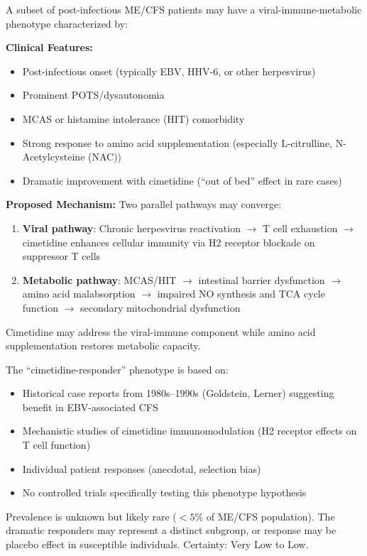 \begin{hypothesis}
\label{hyp:cimetidine-responder}
A subset of post-infectious ME/CFS patients may have a viral-immune-metabolic phenotype characterized by:

\textbf{Clinical Features:}
\begin{itemize}
    \item Post-infectious onset (typically EBV, HHV-6, or other herpesvirus)
    \item Prominent POTS/dysautonomia
    \item MCAS or histamine intolerance (HIT) comorbidity
    \item Strong response to amino acid supplementation (especially L-citrulline, N-Acetylcysteine (NAC))
    \item Dramatic improvement with cimetidine (``out of bed'' effect in rare cases)
\end{itemize}

\textbf{Proposed Mechanism:}
Two parallel pathways may converge:
\begin{enumerate}
    \item \textbf{Viral pathway}: Chronic herpesvirus reactivation $\rightarrow$ T cell exhaustion $\rightarrow$ cimetidine enhances cellular immunity via H2 receptor blockade on suppressor T cells~\cite{Goldstein1986cimetidine,Simons2019cimetidine}
    \item \textbf{Metabolic pathway}: MCAS/HIT $\rightarrow$ intestinal barrier dysfunction $\rightarrow$ amino acid malabsorption $\rightarrow$ impaired NO synthesis and TCA cycle function $\rightarrow$ secondary mitochondrial dysfunction
\end{enumerate}

Cimetidine may address the viral-immune component while amino acid supplementation restores metabolic capacity.
\end{hypothesis}

\begin{warning}
The ``cimetidine-responder'' phenotype is based on:
\begin{itemize}
    \item Historical case reports from 1980s--1990s (Goldstein, Lerner) suggesting benefit in EBV-associated CFS~\cite{Goldstein1986cimetidine}
    \item Mechanistic studies of cimetidine immunomodulation (H2 receptor effects on T cell function)~\cite{Simons2019cimetidine}
    \item Individual patient responses (anecdotal, selection bias)
    \item No controlled trials specifically testing this phenotype hypothesis
\end{itemize}
Prevalence is unknown but likely rare ($<5\%$ of ME/CFS population). The dramatic responders may represent a distinct subgroup, or response may be placebo effect in susceptible individuals. Certainty: Very Low to Low.
\end{warning}

